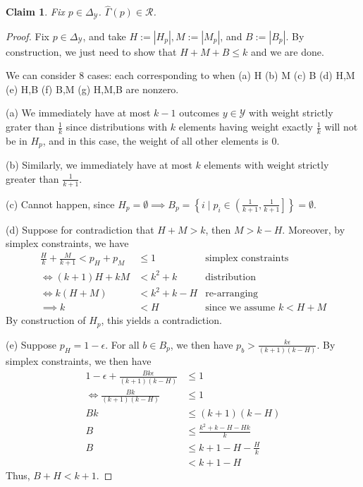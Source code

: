 \documentclass[12pt]{article}
\newcommand{\simplex}{\Delta_\Y}
\newcommand{\R}{\mathcal{R}}
\newcommand{\Y}{\mathcal{Y}}
\newtheorem{claim}{Claim}
\begin{document}
\begin{claim}\label{claim:hat-Gamma-subset-R}
	Fix $p \in \simplex$.
	$\hat \Gamma(p) \in \R$.
\end{claim}	
\begin{proof}
	Fix $p \in \simplex$, and take $H := |H_p|, M:= |M_p|$, and $B := |B_p|$.
	By construction, we just need to show that $H + M + B \leq k$ and we are done.
	
	We can consider $8$ cases: each corresponding to when (a) H (b) M (c) B (d) H,M (e) H,B (f) B,M (g) H,M,B are nonzero.
	
	(a) We immediately have at most $k-1$ outcomes $y \in \Y$ with weight strictly grater than $\frac 1 k$ since distributions with $k$ elements having weight exactly $\frac 1 k$ will not be in $H_p$, and in this case, the weight of all other elements is $0$.
	
	(b) Similarly, we immediately have at most $k$ elements with weight strictly greater than $\frac 1 {k+1}$.
	
	(c) Cannot happen, since $H_p = \emptyset \implies B_p = \left\{i \mid p_i \in \left(\frac{1}{k+1}, \frac{1}{k+1}\right]\right\} = \emptyset$.
	
	(d) Suppose for contradiction that $H+M > k$, then $M > k-H$.
	Moreover, by simplex constraints, we have \begin{align*}
	\frac{H}{k} + \frac{M}{k+1} < p_H + p_M &\leq 1 & \text{simplex constraints}\\
	\iff (k+1) H + kM &< k^2 + k &\text{distribution}\\
	\iff k(H+M) &< k^2 + k- H &\text{re-arranging}\\
	\implies k &< H & \text{since we assume $k < H+M$}
	\end{align*}
	By construction of $H_p$, this yields a contradiction.	
	
	(e) Suppose $p_H = 1 - \epsilon$.
	For all $b \in B_p$, we then have $p_b > \frac{k \epsilon}{(k+1)(k-H)}$.
	By simplex constraints, we then have 
	\begin{align*}
	1 - \epsilon + \frac{Bk\epsilon}{(k+1)(k-H)}&\leq 1 \\
	\iff \frac{Bk}{(k+1)(k-H)}&\leq 1 \\
	Bk &\leq (k+1)(k-H)\\
	B &\leq \frac{k^2 + k - H - Hk}{k}\\
	B &\leq k+1-H - \frac H k \\
	&< k+1 - H
	\end{align*}
	Thus, $B+H < k+1$.
	

\end{proof}
\end{document}
